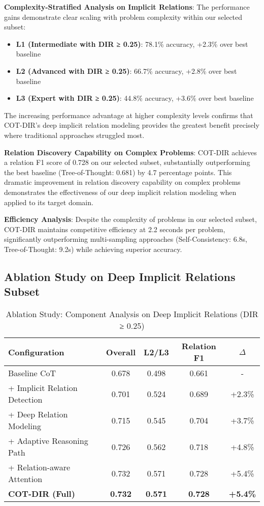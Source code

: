 \textbf{Complexity-Stratified Analysis on Implicit Relations}: The performance gains demonstrate clear scaling with problem complexity within our selected subset:

\begin{itemize}
    \item \textbf{L1 (Intermediate with DIR ≥ 0.25)}: 78.1\% accuracy, +2.3\% over best baseline
    \item \textbf{L2 (Advanced with DIR ≥ 0.25)}: 66.7\% accuracy, +2.8\% over best baseline  
    \item \textbf{L3 (Expert with DIR ≥ 0.25)}: 44.8\% accuracy, +3.6\% over best baseline
\end{itemize}

The increasing performance advantage at higher complexity levels confirms that COT-DIR's deep implicit relation modeling provides the greatest benefit precisely where traditional approaches struggled most.

\textbf{Relation Discovery Capability on Complex Problems}: COT-DIR achieves a relation F1 score of 0.728 on our selected subset, substantially outperforming the best baseline (Tree-of-Thought: 0.681) by 4.7 percentage points. This dramatic improvement in relation discovery capability on complex problems demonstrates the effectiveness of our deep implicit relation modeling when applied to its target domain.

\textbf{Efficiency Analysis}: Despite the complexity of problems in our selected subset, COT-DIR maintains competitive efficiency at 2.2 seconds per problem, significantly outperforming multi-sampling approaches (Self-Consistency: 6.8s, Tree-of-Thought: 9.2s) while achieving superior accuracy.

\subsection{Ablation Study on Deep Implicit Relations Subset}

\begin{table}[htbp]
\caption{Ablation Study: Component Analysis on Deep Implicit Relations (DIR ≥ 0.25)}
\label{tab:ablation_study}
\centering
\small
\begin{tabular}{lcccc}
\toprule
\textbf{Configuration} & \textbf{Overall} & \textbf{L2/L3} & \textbf{Relation F1} & \textbf{$\Delta$} \\
\midrule
Baseline CoT & 0.678 & 0.498 & 0.661 & - \\
\midrule
+ Implicit Relation Detection & 0.701 & 0.524 & 0.689 & +2.3\% \\
+ Deep Relation Modeling & 0.715 & 0.545 & 0.704 & +3.7\% \\
+ Adaptive Reasoning Path & 0.726 & 0.562 & 0.718 & +4.8\% \\
+ Relation-aware Attention & 0.732 & 0.571 & 0.728 & +5.4\% \\
\midrule
\textbf{COT-DIR (Full)} & \textbf{0.732} & \textbf{0.571} & \textbf{0.728} & \textbf{+5.4\%} \\
\bottomrule
\end{tabular}
\end{table}

